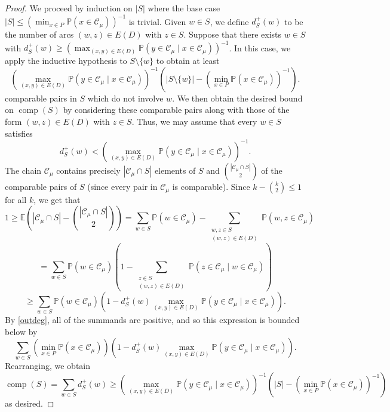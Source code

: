 \documentclass[11 pt]{article}
\theoremstyle{definition}
\theoremstyle{case}
\numberwithin{equation}{section}
\DeclareMathOperator{\comp}{comp}
\begin{document}
\begin{proof}
We proceed by induction on $|S|$ where the base case $|S|\leq \left({\min_{x\in P}\mathbb{P}\left(x\in\mathcal{C}_\mu\right)}\right)^{-1}$ is trivial. Given $w\in S$, we define $d_S^+(w)$ to be the number of arcs $(w,z)\in E(D)$ with $z\in S$. Suppose that there exists $w\in S$ with $d^+_S(w)\geq \left({\max_{(x,y)\in E(D)}\mathbb{P}\left(y\in \mathcal{C}_\mu\mid x\in\mathcal{C}_\mu\right)}\right)^{-1}$. In this case, we apply the inductive hypothesis to $S\setminus\{w\}$ to obtain at least 
\[\left({\max_{(x,y)\in E(D)}\mathbb{P}\left(y\in \mathcal{C}_\mu\mid x\in\mathcal{C}_\mu\right)}\right)^{-1}\left(|S\setminus \{w\}|- \left({\min_{x\in P}\mathbb{P}\left(x\in\mathcal{C}_\mu\right)}\right)^{-1}\right).\]
comparable pairs in $S$ which do not involve $w$. We then obtain the desired bound on $\comp(S)$ by considering these comparable pairs along with those of the form $(w,z)\in E(D)$ with $z\in S$. Thus, we may assume that every $w\in S$ satisfies 
\begin{equation}\label{outdeg}d_S^+(w)< \left({\max_{(x,y)\in E(D)}\mathbb{P}\left(y\in \mathcal{C}_\mu\mid x\in\mathcal{C}_\mu\right)}\right)^{-1}.\end{equation}
The chain $\mathcal{C}_\mu$ contains precisely $|\mathcal{C}_\mu\cap S|$ elements of $S$ and  $\binom{|\mathcal{C}_\mu\cap S|}{2}$ of the comparable pairs of $S$ (since every pair in $\mathcal{C}_\mu$ is comparable). Since $k-\binom{k}{2}\leq 1$ for all $k$, we get that
\[1\geq \mathbb{E}\left(|\mathcal{C}_\mu\cap S| - \binom{|\mathcal{C}_\mu\cap S|}{2}\right) =\sum_{w\in S}\mathbb{P}\left(w\in\mathcal{C}_\mu\right) - \sum_{\substack{w,z\in S \\ (w,z)\in E(D)}}\mathbb{P}\left(w,z\in \mathcal{C}_\mu\right)\]
\[=\sum_{w\in S}\mathbb{P}\left(w\in \mathcal{C}_\mu\right)\left(1-\sum_{\substack{z\in S\\ (w,z)\in E(D)}}\mathbb{P}\left(z\in \mathcal{C}_\mu\mid w\in \mathcal{C}_\mu\right)\right)\]
\[\geq\sum_{w\in S}\mathbb{P}\left(w\in \mathcal{C}_\mu\right)\left(1-d^+_S(w){\max_{(x,y)\in E(D)}\mathbb{P}\left(y\in \mathcal{C}_\mu\mid x\in\mathcal{C}_\mu\right)}\right).\]
By \eqref{outdeg}, all of the summands are positive, and so this expression is bounded below by
\[\sum_{w\in S}\left({\min_{x\in P}\mathbb{P}\left(x\in\mathcal{C}_\mu\right)}\right)\left(1-d^+_S(w){\max_{(x,y)\in E(D)}\mathbb{P}\left(y\in \mathcal{C}_\mu\mid x\in\mathcal{C}_\mu\right)}\right).\]
Rearranging, we obtain
\[\comp(S) = \sum_{w\in S}d_S^+(w) \geq \left({\max_{(x,y)\in E(D)}\mathbb{P}\left(y\in \mathcal{C}_\mu\mid x\in\mathcal{C}_\mu\right)}\right)^{-1}\left(|S| - \left({\min_{x\in P}\mathbb{P}\left(x\in\mathcal{C}_\mu\right)}\right)^{-1}\right)\]
as desired.
\end{proof}
\end{document}
